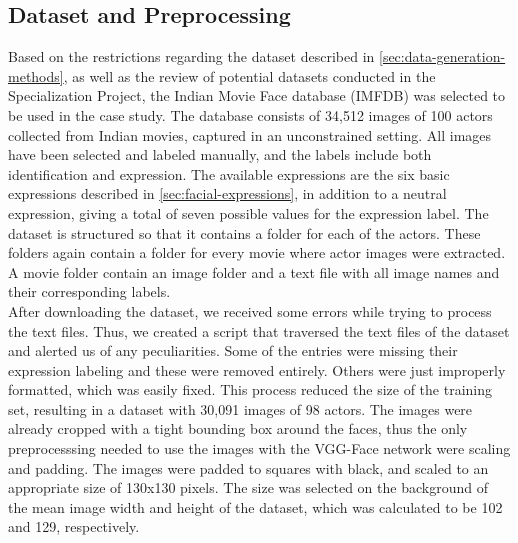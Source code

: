 \subsection{Dataset and Preprocessing}

Based on the restrictions regarding the dataset described in \autoref{sec:data-generation-methods}, as well as the review of potential datasets conducted in the Specialization Project, the Indian Movie Face database (IMFDB) \cite{imfdb} was selected to be used in the case study. The database consists of 34,512 images of 100 actors collected from Indian movies, captured in an unconstrained setting. All images have been selected and labeled manually, and the labels include both identification and expression. The available expressions are the six basic expressions described in \autoref{sec:facial-expressions}, in addition to a neutral expression, giving a total of seven possible values for the expression label. The dataset is structured so that it contains a folder for each of the actors. These folders again contain a folder for every movie where actor images were extracted. A movie folder contain an image folder and a text file with all image names and their corresponding labels. \\

\noindent After downloading the dataset, we received some errors while trying to process the text files. Thus, we created a script that traversed the text files of the dataset and alerted us of any peculiarities. Some of the entries were missing their expression labeling and these were removed entirely. Others were just improperly formatted, which was easily fixed. This process reduced the size of the training set, resulting in a dataset with 30,091 images of 98 actors. The images were already cropped with a tight bounding box around the faces, thus the only preprocesssing needed to use the images with the VGG-Face network were scaling and padding. The images were padded to squares with black, and scaled to an appropriate size of 130x130 pixels. The size was selected on the background of the mean image width and height of the dataset, which was calculated to be 102 and 129, respectively. \\

